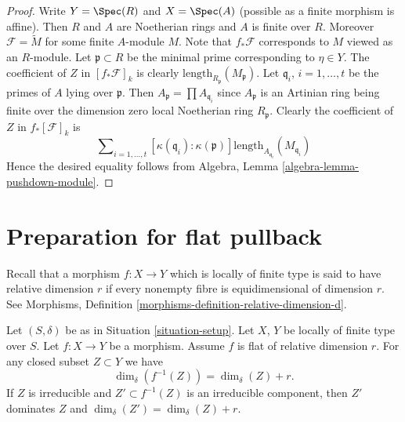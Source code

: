 \begin{proof}
\medskip\noindent
Write $Y = \Spec(R)$ and $X = \Spec(A)$ (possible as
a finite morphism is affine).
Then $R$ and $A$ are Noetherian rings and $A$ is finite over $R$.
Moreover $\mathcal{F} = \widetilde{M}$ for some finite $A$-module
$M$. Note that $f_*\mathcal{F}$ corresponds to $M$ viewed as an $R$-module.
Let $\mathfrak p \subset R$ be the minimal prime corresponding
to $\eta \in Y$. The coefficient of $Z$ in $[f_*\mathcal{F}]_k$
is clearly $\text{length}_{R_{\mathfrak p}}(M_{\mathfrak p})$.
Let $\mathfrak q_i$, $i = 1, \ldots, t$ be the primes of $A$
lying over $\mathfrak p$. Then $A_{\mathfrak p} = \prod A_{\mathfrak q_i}$
since $A_{\mathfrak p}$ is an Artinian ring being finite over the
dimension zero local Noetherian ring $R_{\mathfrak p}$.
Clearly the coefficient of $Z$ in $f_*[\mathcal{F}]_k$ is
$$
\sum\nolimits_{i = 1, \ldots, t}
[\kappa(\mathfrak q_i) : \kappa(\mathfrak p)]
\text{length}_{A_{\mathfrak q_i}}(M_{\mathfrak q_i})
$$
Hence the desired equality follows from
Algebra, Lemma \ref{algebra-lemma-pushdown-module}.
\end{proof}




















\section{Preparation for flat pullback}
\label{section-preparation-flat-pullback}


\noindent
Recall that a morphism $f : X \to Y$ which is locally of finite type
is said to have relative dimension $r$ if every nonempty fibre
is equidimensional of dimension $r$. See
Morphisms, Definition \ref{morphisms-definition-relative-dimension-d}.

\begin{lemma}
\label{lemma-flat-inverse-image-dimension}
Let $(S, \delta)$ be as in Situation \ref{situation-setup}.
Let $X$, $Y$ be locally of finite type over $S$.
Let $f : X \to Y$ be a morphism.
Assume $f$ is flat of relative dimension $r$.
For any closed subset $Z \subset Y$ we have
$$
\dim_\delta(f^{-1}(Z)) = \dim_\delta(Z) + r.
$$
If $Z$ is irreducible and $Z' \subset f^{-1}(Z)$ is an irreducible
component, then $Z'$ dominates $Z$ and
$\dim_\delta(Z') = \dim_\delta(Z) + r$.
\end{lemma}


